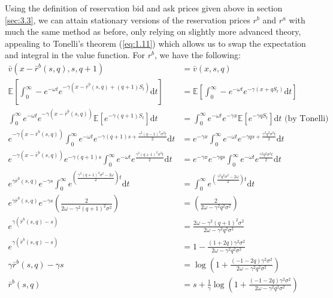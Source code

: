 Using the definition of reservation bid and ask 
prices given above in section \ref{sec:3.3}, we can attain stationary versions of the 
reservation prices $r^b$ and $r^a$ with much the same method as before, only relying on
slightly more advanced theory, appealing to Tonelli's theorem (\ref{eq:1.11}) which 
allows us to swap the expectation and integral in the value function. For $r^b$, we 
have the following:
\begin{align*}
    \bar{v}(x-\bar{r}^b(s,q),s,q+1)&=\bar{v}(x,s,q)\\
    \mathbb{E}\left[\int_{0}^{\infty}-e^{-\omega t}e^{-\gamma(x-\bar{r}^b(s,q)+(q+1)S_t)}\mathrm dt\right]&=\mathbb{E}\left[\int_{0}^{\infty}-e^{-\omega t}e^{-\gamma(x+qS_t)}\mathrm dt\right]\\
    \int_{0}^{\infty}e^{-\omega t}e^{-\gamma(x-\bar{r}^b(s,q))}\mathbb{E}\left[e^{-\gamma(q+1)S_t}\right]\mathrm dt&=\int_{0}^{\infty}e^{-\omega t}e^{-\gamma x}\mathbb{E}\left[e^{-\gamma qS_t}\right]\mathrm dt\textrm{ (by Tonelli)}\\
    e^{-\gamma(x-\bar{r}^b(s,q))}\int_{0}^{\infty}e^{-\omega t}e^{-\gamma(q+1)s+\frac{\gamma^2(q-1)^2\sigma^2t}{2}}\mathrm dt&=e^{-\gamma x}\int_{0}^{\infty}e^{-\omega t}e^{-\gamma qs+\frac{\gamma^2q^2\sigma^2t}{2}}\mathrm dt\\
    e^{-\gamma(x-\bar{r}^b(s,q))}e^{-\gamma(q+1)s}\int_{0}^{\infty}e^{-\omega t}e^{\frac{\gamma^2(q+1)^2\sigma^2t}{2}}\mathrm dt&=e^{-\gamma x}e^{-\gamma qs}\int_{0}^{\infty}e^{-\omega t}e^{\frac{\gamma^2q^2\sigma^2t}{2}}\mathrm dt\\
    e^{\gamma \bar{r}^b(s,q)}e^{-\gamma s}\int_{0}^{\infty}e^{\left(\frac{\gamma^2(q+1)^2\sigma^2-2\omega}{2}\right)t}\mathrm dt&=\int_{0}^{\infty}e^{\left(\frac{\gamma^2q^2\sigma^2-2\omega}{2}\right)t}\mathrm dt\\
    e^{\gamma \bar{r}^b(s,q)}e^{-\gamma s}\left(\frac{2}{2\omega-\gamma^2(q+1)^2\sigma^2}\right)&=\left(\frac{2}{2\omega-\gamma^2q^2\sigma^2}\right)\\
    e^{\gamma(\bar{r}^b(s,q)-s)}&=\frac{2\omega-\gamma^2(q+1)^2\sigma^2}{2\omega-\gamma^2q^2\sigma^2}\\
    e^{\gamma(\bar{r}^b(s,q)-s)}&=1-\frac{(1+2q)\gamma^2\sigma^2}{2\omega-\gamma^2q^2\sigma^2}\\
    \gamma\bar{r}^b(s,q)-\gamma s&=\log\left(1+\frac{(-1-2q)\gamma^2\sigma^2}{2\omega-\gamma^2q^2\sigma^2}\right)\\
    \bar{r}^b(s,q) &= s+\frac{1}{\gamma}\log\left(1+\frac{(-1-2q)\gamma^2\sigma^2}{2\omega-\gamma^2q^2\sigma^2}\right)
\end{align*}
